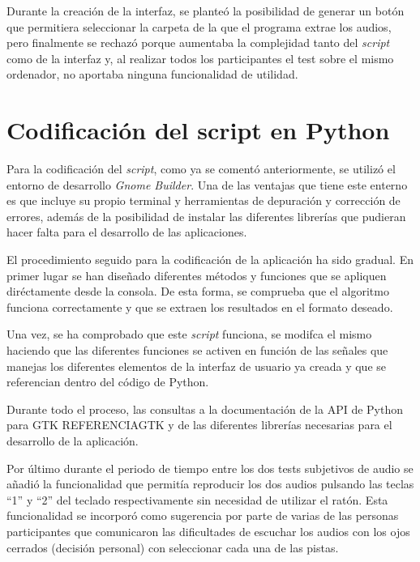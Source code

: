 \documentclass[11pt,a4paper,twoside]{book}
\begin{document}
            Durante la creación de la interfaz, se planteó la posibilidad de generar un botón que permitiera seleccionar la carpeta de la que el programa extrae los audios, pero finalmente se rechazó porque aumentaba la complejidad tanto del \textit{script} como de la interfaz y, al realizar todos los participantes el test sobre el mismo ordenador, no aportaba ninguna funcionalidad de utilidad.
            
        \section{Codificación del script en Python}
            Para la codificación del \textit{script}, como ya se comentó anteriormente, se utilizó el entorno de desarrollo \textit{Gnome Builder}. Una de las ventajas que tiene este enterno es que incluye su propio terminal y herramientas de depuración y corrección de errores, además de la posibilidad de instalar las diferentes librerías que pudieran hacer falta para el desarrollo de las aplicaciones.
            
            El procedimiento seguido para la codificación de la aplicación ha sido gradual. En primer lugar se han diseñado diferentes métodos y funciones que se apliquen diréctamente desde la consola. De esta forma, se comprueba que el algoritmo funciona correctamente y que se extraen los resultados en el formato deseado.
            
            Una vez, se ha comprobado que este \textit{script} funciona, se modifca el mismo haciendo que las diferentes funciones se activen en función de las señales que manejas los diferentes elementos de la interfaz de usuario ya creada y que se referencian dentro del código de Python.
            
            Durante todo el proceso, las consultas a la documentación de la API de Python para GTK REFERENCIAGTK y de las diferentes librerías necesarias para el desarrollo de la aplicación.
            
            Por último durante el periodo de tiempo entre los dos tests subjetivos de audio se añadió la funcionalidad que permitía reproducir los dos audios pulsando las teclas ``1'' y ``2'' del teclado respectivamente sin necesidad de utilizar el ratón. Esta funcionalidad se incorporó como sugerencia por parte de varias de las personas participantes que comunicaron las dificultades de escuchar los audios con los ojos cerrados (decisión personal) con seleccionar cada una de las pistas.
            
\end{document}
